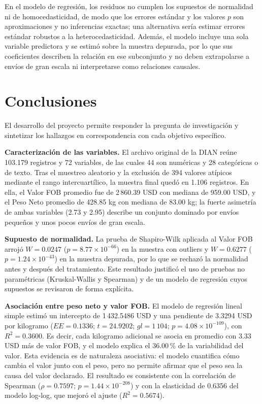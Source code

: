 \documentclass[12pt]{article}
\begin{document}
En el modelo de regresión, los residuos no cumplen los supuestos de
normalidad ni de homocedasticidad, de modo que los errores estándar y
los valores \(p\) son aproximaciones y no inferencias exactas; una
alternativa sería estimar errores estándar robustos a la
heterocedasticidad. Además, el modelo incluye una sola variable
predictora y se estimó sobre la muestra depurada, por lo que sus
coeficientes describen la relación en ese subconjunto y no deben
extrapolarse a envíos de gran escala ni interpretarse como relaciones
causales.

\section{Conclusiones}

El desarrollo del proyecto permite responder la pregunta de
investigación y sintetizar los hallazgos en correspondencia con cada
objetivo específico.

\textbf{Caracterización de las variables.} El archivo original de la
DIAN reúne 103.179 registros y 72 variables, de las cuales 44 son
numéricas y 28 categóricas o de texto. Tras el muestreo aleatorio y la
exclusión de 394 valores atípicos mediante el rango intercuartílico, la
muestra final quedó en 1.106 registros. En ella, el Valor FOB promedio
fue de 2\,860.39 USD con mediana de 959.00 USD, y el Peso Neto promedio
de 428.85 kg con mediana de 83.00 kg; la fuerte asimetría de ambas
variables (2.73 y 2.95) describe un conjunto dominado por envíos
pequeños y unos pocos envíos de gran escala.

\textbf{Supuesto de normalidad.} La prueba de Shapiro-Wilk aplicada al
Valor FOB arrojó \(W = 0.0247\) (\(p = 8.77 \times 10^{-66}\)) en la
muestra con outliers y \(W = 0.6277\) (\(p = 1.24 \times 10^{-43}\)) en
la muestra depurada, por lo que se rechazó la normalidad antes y
después del tratamiento. Este resultado justificó el uso de pruebas no
paramétricas (Kruskal-Wallis y Spearman) y de un modelo de regresión
cuyos supuestos se revisaron de forma explícita.

\textbf{Asociación entre peso neto y valor FOB.} El modelo de regresión
lineal simple estimó un intercepto de 1\,432.5486 USD y una pendiente de
3.3294 USD por kilogramo (\(EE = 0.1336\); \(t = 24.9202\);
\(gl = 1\,104\); \(p = 4.08 \times 10^{-109}\)), con
\(R^2 = 0.3600\). Es decir, cada kilogramo adicional se asocia en
promedio con 3.33 USD más de valor FOB, y el modelo explica el 36.00\,\%
de la variabilidad del valor. Esta evidencia es de naturaleza
asociativa: el modelo cuantifica cómo cambia el valor junto con el peso,
pero no permite afirmar que el peso sea la causa del valor declarado.
El resultado es consistente con la
correlación de Spearman (\(\rho = 0.7597\);
\(p = 1.44 \times 10^{-208}\)) y con la elasticidad de 0.6356 del
modelo log-log, que mejoró el ajuste (\(R^2 = 0.5674\)).
\end{document}
